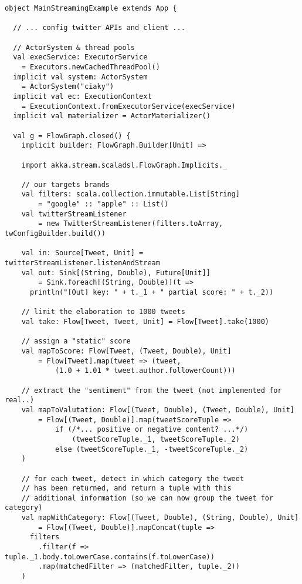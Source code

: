 \begin{verbatim}
object MainStreamingExample extends App {

  // ... config twitter APIs and client ...

  // ActorSystem & thread pools
  val execService: ExecutorService
    = Executors.newCachedThreadPool()
  implicit val system: ActorSystem
    = ActorSystem("ciaky")
  implicit val ec: ExecutionContext
    = ExecutionContext.fromExecutorService(execService)
  implicit val materializer = ActorMaterializer()

  val g = FlowGraph.closed() {
    implicit builder: FlowGraph.Builder[Unit] =>

    import akka.stream.scaladsl.FlowGraph.Implicits._

    // our targets brands
    val filters: scala.collection.immutable.List[String]
        = "google" :: "apple" :: List()
    val twitterStreamListener
        = new TwitterStreamListener(filters.toArray, twConfigBuilder.build())

    val in: Source[Tweet, Unit] = twitterStreamListener.listenAndStream
    val out: Sink[(String, Double), Future[Unit]]
        = Sink.foreach[(String, Double)](t =>
      println("[Out] key: " + t._1 + " partial score: " + t._2))

    // limit the elaboration to 1000 tweets
    val take: Flow[Tweet, Tweet, Unit] = Flow[Tweet].take(1000)

    // assign a "static" score
    val mapToScore: Flow[Tweet, (Tweet, Double), Unit]
        = Flow[Tweet].map(tweet => (tweet,
            (1.0 + 1.01 * tweet.author.followerCount)))

    // extract the "sentiment" from the tweet (not implemented for real..)
    val mapToValutation: Flow[(Tweet, Double), (Tweet, Double), Unit]
        = Flow[(Tweet, Double)].map(tweetScoreTuple =>
            if (/*... positive or negative content? ...*/)
                (tweetScoreTuple._1, tweetScoreTuple._2)
            else (tweetScoreTuple._1, -tweetScoreTuple._2)
    )

    // for each tweet, detect in which category the tweet
    // has been returned, and return a tuple with this
    // additional information (so we can now group the tweet for category)
    val mapWithCategory: Flow[(Tweet, Double), (String, Double), Unit]
        = Flow[(Tweet, Double)].mapConcat(tuple =>
      filters
        .filter(f => tuple._1.body.toLowerCase.contains(f.toLowerCase))
        .map(matchedFilter => (matchedFilter, tuple._2))
    )


\end{verbatim}
